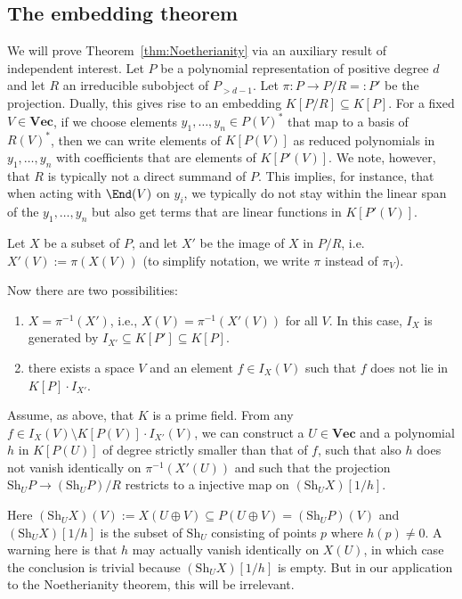 \documentclass{amsart}
\renewcommand{\Vec}{\mathbf{Vec}}
\newcommand{\Sh}{\mathrm{Sh}}
\begin{document}
\subsection{The embedding theorem} \label{ssec:Embedding}

We will prove Theorem~\ref{thm:Noetherianity} via an auxiliary result of
independent interest. Let $P$ be a polynomial representation of positive degree
$d$ and let $R$ an irreducible subobject of $P_{>d-1}$. Let $\pi:P
\to P/R=:P'$ be the projection. Dually, this gives rise to an embedding
$K[P/R] \subseteq K[P]$. For a fixed $V \in \Vec$, if we choose elements
$y_1,\ldots,y_n \in P(V)^*$ that map to a basis of $R(V)^*$, then we can
write elements of $K[P(V)]$ as reduced polynomials in $y_1,\ldots,y_n$
with coefficients that are elements of $K[P'(V)]$. We note, however,
that $R$ is typically not a direct summand of $P$. This implies, for
instance, that when acting with $\End(V)$ on $y_i$, we typically do not
stay within the linear span of the $y_1,\ldots,y_n$ but also get terms
that are linear functions in $K[P'(V)]$.

Let $X$ be a subset of $P$, and let $X'$ be the image of $X$ in $P/R$,
i.e. $X'(V):=\pi(X(V))$ (to simplify notation, we write $\pi$ instead
of $\pi_V$).

Now there are two possibilities: 
\begin{enumerate}
\item $X=\pi^{-1}(X')$, i.e., $X(V)=\pi^{-1}(X'(V))$ for all $V$. In
this case, $I_X$ is generated by $I_{X'} \subseteq K[P'] \subseteq K[P]$.

\item there exists a space $V$ and an element $f \in I_X(V)$ such that
$f$ does not lie in $K[P] \cdot I_{X'}$. 
\end{enumerate}

\begin{thm}
Assume, as above, that $K$ is a prime field. From any $f \in I_X(V)
\setminus K[P(V)] \cdot I_{X'}(V)$, we can construct a $U \in \Vec$ and
a polynomial $h$ in $K[P(U)]$ of degree strictly smaller than that of
$f$, such that also $h$ does not vanish identically on $\pi^{-1}(X'(U))$
and such that the projection $\Sh_U P \to (\Sh_U P)/R$ restricts to
a injective map on $(\Sh_U X)[1/h]$.
\end{thm}

Here $(\Sh_U X)(V):=X(U \oplus V) \subseteq P(U \oplus V)=(\Sh_U P)(V)$
and $(\Sh_U X)[1/h]$ is the subset of $\Sh_U$ consisting of points $p$
where $h(p) \neq 0$. A warning here is that $h$ may actually vanish
identically on $X(U)$, in which case the conclusion is trivial because
$(\Sh_U X)[1/h]$ is empty. But in our application to the Noetherianity
theorem, this will be irrelevant.
\end{document}
